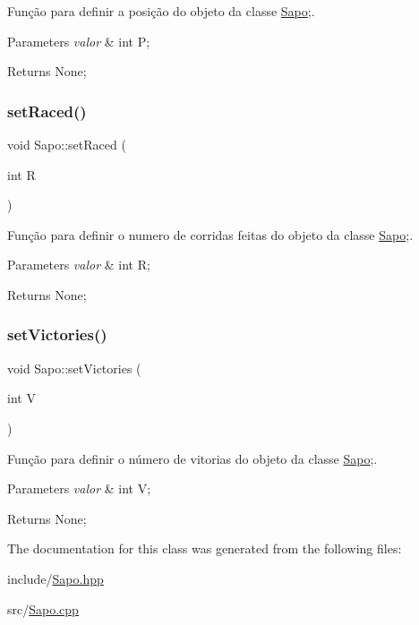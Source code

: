 Função para definir a posição do objeto da classe \mbox{\hyperlink{class_sapo}{Sapo}};. 


\begin{DoxyParams}{Parameters}
{\em valor} & int P; \\
\hline
\end{DoxyParams}
\begin{DoxyReturn}{Returns}
None; 
\end{DoxyReturn}
\mbox{\label{class_sapo_a64d35acf5942677a72cb0db282ba60b7}} 
\subsubsection{\texorpdfstring{set\+Raced()}{setRaced()}}
{\footnotesize\ttfamily void Sapo\+::set\+Raced (\begin{DoxyParamCaption}\item[{int}]{R }\end{DoxyParamCaption})}



Função para definir o numero de corridas feitas do objeto da classe \mbox{\hyperlink{class_sapo}{Sapo}};. 


\begin{DoxyParams}{Parameters}
{\em valor} & int R; \\
\hline
\end{DoxyParams}
\begin{DoxyReturn}{Returns}
None; 
\end{DoxyReturn}
\mbox{\label{class_sapo_a2b559f3706b66759c13bed2c8ed6eac5}} 
\subsubsection{\texorpdfstring{set\+Victories()}{setVictories()}}
{\footnotesize\ttfamily void Sapo\+::set\+Victories (\begin{DoxyParamCaption}\item[{int}]{V }\end{DoxyParamCaption})}



Função para definir o número de vitorias do objeto da classe \mbox{\hyperlink{class_sapo}{Sapo}};. 


\begin{DoxyParams}{Parameters}
{\em valor} & int V; \\
\hline
\end{DoxyParams}
\begin{DoxyReturn}{Returns}
None; 
\end{DoxyReturn}


The documentation for this class was generated from the following files\+:\begin{DoxyCompactItemize}
\item 
include/\mbox{\hyperlink{_sapo_8hpp}{Sapo.\+hpp}}\item 
src/\mbox{\hyperlink{_sapo_8cpp}{Sapo.\+cpp}}\end{DoxyCompactItemize}
